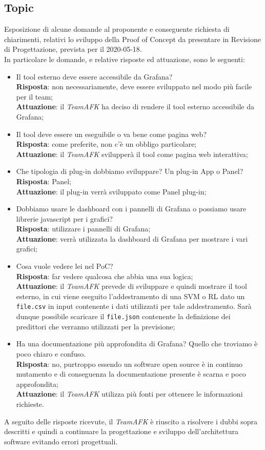 \subsection{Topic}
Esposizione di alcune domande al proponente e conseguente richiesta di chiarimenti, relativi lo sviluppo della Proof of Concept da presentare in Revisione di Progettazione, prevista per il 2020-05-18.\\
In particolare le domande, e relative risposte ed attuazione, sono le seguenti:
\begin{itemize}
	\item Il tool esterno deve essere accessibile da Grafana\glo?\\
	\textbf{Risposta}: non necessariamente, deve essere sviluppato nel modo più facile per il team;\\
	\textbf{Attuazione}: il \textit{TeamAFK} ha deciso di rendere il tool esterno accessibile da Grafana;
	\item Il tool deve essere un eseguibile o va bene come pagina web? \\
	\textbf{Risposta}: come preferite, non c'è un obbligo particolare; \\
	\textbf{Attuazione}: il \textit{TeamAFK} svilupperà il tool come pagina web interattiva;
	\item Che tipologia di plug-in dobbiamo sviluppare? Un plug-in App o Panel? \\
	\textbf{Risposta}: Panel;\\
	\textbf{Attuazione}: il plug-in verrà sviluppato come Panel plug-in;
	\item Dobbiamo usare le dashboard con i pannelli di Grafana o possiamo usare librerie javascript per i grafici? \\
	\textbf{Risposta}: utilizzare i pannelli di Grafana;\\
	\textbf{Attuazione}: verrà utilizzata la dashboard di Grafana per mostrare i vari grafici;
	\item Cosa vuole vedere lei nel PoC? \\
	\textbf{Risposta}: far vedere qualcosa che abbia una sua logica;\\
	\textbf{Attuazione}: il \textit{TeamAFK} prevede di sviluppare e quindi mostrare il tool esterno, in cui viene eseguito l'addestramento di una SVM o RL dato un \texttt{file.csv} in input contenente i dati utilizzati per tale addestramento. Sarà dunque possibile scaricare il \texttt{file.json} contenente la definizione dei predittori che verranno utilizzati per la previsione;
	\item Ha una documentazione più approfondita di Grafana? Quello che troviamo è poco chiaro e confuso.\\
	\textbf{Risposta}: no, purtroppo essendo un software open source è in continuo mutamento e di conseguenza la documentazione presente è scarna e poco approfondita;\\
	\textbf{Attuazione}: il \textit{TeamAFK} utilizza più fonti per ottenere le informazioni richieste.
\end{itemize}
A seguito delle risposte ricevute, il \textit{TeamAFK} è riuscito a risolvere i dubbi sopra descritti e quindi a continuare la progettazione e sviluppo dell'architettura software evitando errori progettuali.